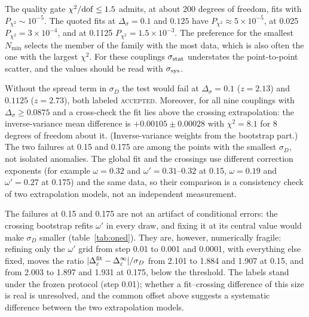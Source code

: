 \documentclass[10pt,a4paper]{article}
\newcommand{\Ds}{\Delta_\sigma}
\newcommand{\De}{\Delta_\varepsilon}
\newcommand{\lbl}[1]{{\mdseries\scshape #1}}
\newcommand{\sstat}{\sigma_{\rm stat}}
\newcommand{\ssys}{\sigma_{\rm sys}}
\begin{document}
\begin{description}[leftmargin=1.2em]
\item[Goodness of fit.] The quality gate $\chi^2/{\rm dof}\le1.5$ admits, at about 200 degrees of freedom, fits with $P_{\chi^2}\sim10^{-5}$.
 The quoted fits at $\Ds=0.1$ and $0.125$ have $P_{\chi^2}\approx5\times10^{-5}$, at 0.025 $P_{\chi^2}=3\times10^{-4}$, and at 0.1125
 $P_{\chi^2}=1.5\times10^{-3}$. The preference for the smallest $N_{\min}$
 selects the member of the family with the most data, which is also often the one with the largest $\chi^2$. For these couplings $\sstat$
 understates the point-to-point scatter, and the values should be read with $\ssys$.
\item[The cross-check and its $\sigma_D$.] Without the spread term in $\sigma_D$ the test would fail at $\Ds=0.1$ ($z=2.13$) and $0.1125$
 ($z=2.73$), both labeled \lbl{accepted}. Moreover, for all nine couplings with $\Ds\ge0.0875$ and a cross-check the fit lies above the
 crossing extrapolation: the inverse-variance mean difference is $+0.00105\pm0.00028$ with $\chi^2=8.1$ for 8 degrees of freedom about it. (Inverse-variance weights from the
 bootstrap part.) The two failures at 0.15 and 0.175 are among the points with the smallest $\sigma_D$, not isolated anomalies. The global fit and the crossings use
 different correction exponents (for example $\omega=0.32$ and $\omega'=0.31$--$0.32$ at 0.15, $\omega=0.19$ and $\omega'=0.27$ at 0.175) and the
 same data, so their comparison is a consistency check of two extrapolation models, not an independent measurement.
\item[The failures and the $\omega'$ grid.] The failures at 0.15 and 0.175 are not an artifact of conditional errors: the crossing bootstrap
 refits $\omega'$ in every draw, and fixing it at its central value would make $\sigma_D$ smaller (table~\ref{tab:oned}). They are, however, numerically fragile:
 refining only the $\omega'$ grid from step 0.01 to 0.001 and 0.0001, with everything else fixed, moves the ratio
 $|\De^{\rm fit}-\De^\infty|/\sigma_D$ from 2.101 to 1.884 and 1.907 at 0.15, and from 2.003 to 1.897 and 1.931 at 0.175, below the
 threshold. The labels stand under the frozen protocol (step 0.01); whether a fit--crossing difference of this size is real is unresolved, and
 the common offset above suggests a systematic difference between the two extrapolation models.
\begin{table}[htbp]\centering\scriptsize
\caption{The cross-check at $\Ds=0.15,0.175$ with $\omega'$ refitted per draw (as recorded) and fixed at its central value. Last column:
}
\end{table}
\end{description}
\end{document}
